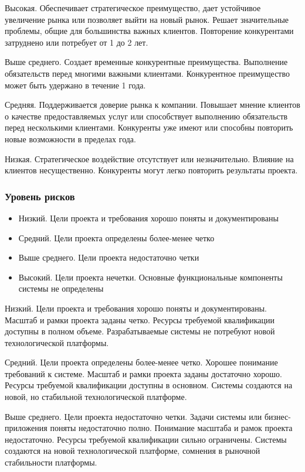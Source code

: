 \documentclass{../industrial-development}
\begin{document}
Высокая. Обеспечивает стратегическое преимущество, дает устойчивое увеличение рынка или позволяет выйти на новый рынок. Решает значительные проблемы, общие для большинства важных клиентов. Повторение конкурентами затруднено или потребует от 1 до 2 лет.

Выше среднего. Создает временные конкурентные преимущества. Выполнение обязательств перед многими важными клиентами. Конкурентное преимущество может быть удержано в течение 1 года.

Средняя. Поддерживается доверие рынка к компании. Повышает мнение клиентов о качестве предоставляемых услуг или способствует выполнению обязательств перед несколькими клиентами. Конкуренты уже имеют или способны повторить новые возможности в пределах года.

Низкая. Стратегическое воздействие отсутствует или незначительно. Влияние на клиентов несущественно. Конкуренты могут легко повторить результаты проекта.

    \begin{frame} \frametitle{Уровень рисков}
	\begin{itemize}
		\item Низкий. Цели проекта и требования хорошо поняты и документированы
		\item Средний. Цели проекта определены более-менее четко
		\item Выше среднего. Цели проекта недостаточно четки
		\item Высокий. Цели проекта нечетки. Основные функциональные компоненты системы не определены
	\end{itemize}
    \end{frame}
    \lecturenotes

Низкий. Цели проекта и требования хорошо поняты и документированы. Масштаб и рамки проекта заданы четко. Ресурсы требуемой квалификации доступны в полном объеме. Разрабатываемые системы не потребуют новой технологической платформы.

Средний. Цели проекта определены более-менее четко. Хорошее понимание требований к системе. Масштаб и рамки проекта заданы достаточно хорошо. Ресурсы требуемой квалификации доступны в основном. Системы создаются на новой, но стабильной технологической платформе.

Выше среднего. Цели проекта недостаточно четки. Задачи системы или бизнес-приложения поняты недостаточно полно. Понимание масштаба и рамок проекта недостаточно. Ресурсы требуемой квалификации сильно ограничены. Системы создаются на новой технологической платформе, сомнения в рыночной стабильности платформы.
\end{document}
